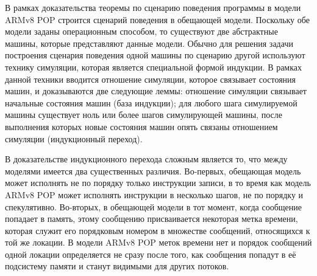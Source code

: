 В рамках доказательства теоремы по сценарию поведения программы в модели ARMv8 POP строится сценарий поведения в обещающей модели.
Поскольку обе модели заданы операционным способом, то существуют две абстрактные машины, которые представляют данные модели.
Обычно для решения задачи построения сценария поведения одной машины по сценарию другой используют технику симуляции,
которая является специальной формой индукции. В рамках данной техники вводится отношение симуляции,
которое связывает состояния машин, и доказываются две следующие леммы:
отношение симуляции связывает начальные состояния машин (база индукции);
для любого шага симулируемой машины существует ноль или более шагов симулирующей машины, после выполнения которых 
новые состояния машин опять связаны отношением симуляции (индукционный переход).




В доказательстве индукционного перехода сложным является то, что между моделями имеется два существенных различия.
Во-первых, обещающая модель может исполнять не по порядку только инструкции записи, 
в то время как модель ARMv8 POP может исполнять инструкции в несколько шагов, не по порядку и спекулятивно.
Во-вторых, в обещающей модели в тот момент, когда сообщение попадает в память, этому сообщению присваивается некоторая
метка времени, которая служит его порядковым номером в множестве сообщений, относящихся к той же локации. В модели ARMv8 POP
меток времени нет и порядок сообщений одной локации определяется не сразу после того, как
сообщения попадут в её подсистему памяти и станут видимыми для других потоков.

